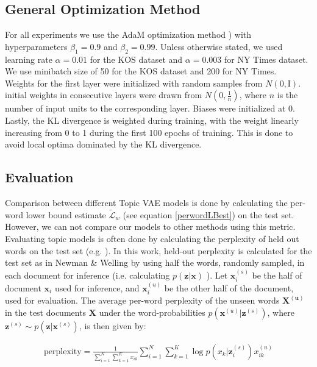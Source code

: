 \documentclass{report}
\begin{document}
	\subsection{General Optimization Method}\label{optim_section}
	For all experiments we use the AdaM optimization method \cite{kingma2014adam}) with hyperparameters $\beta_1 = 0.9$ and $\beta_2 = 0.99$. Unless otherwise stated, we used learning rate $\alpha = 0.01$ for the KOS dataset and $\alpha = 0.003$ for NY Times dataset.  We use minibatch size of 50 for the KOS dataset and 200 for NY Times.  \\
	Weights for the first layer were initialized with random samples from $N(0,\text{I})$. initial weights in consecutive layers were drawn from  $N(0,\frac{1}{n})$, where $n$ is the number of input units to the corresponding layer. Biases were initialized at 0.
	\\Lastly, the KL divergence is weighted during training, with the weight linearly increasing from 0 to 1 during the first 100 epochs of training. This is done to avoid local optima dominated by the KL divergence. 	
	
	\subsection{Evaluation}
	Comparison between different Topic VAE models is done by calculating the per-word lower bound estimate $\tilde{\mathcal{L}}_w$ (see equation \ref{perwordLBest}) on the test set. However, we can not compare our models to other methods using this metric. \\
	Evaluating topic models is often done by calculating the perplexity of held out words on the test set (e.g. \cite{blei2003latent, newman2007distributed, ranganath2015deep}). In this work, held-out perplexity is calculated for the test set as in Newman \& Welling \cite{newman2007distributed} by using half the words, randomly sampled, in each document for inference (i.e. calculating $p(\mathbf{z}|\mathbf{x})$ ). Let $\mathbf{x}_{i}^{(s)}$ be the half of document $\mathbf{x}_i$ used for inference, and $\mathbf{x}_{i}^{(u)}$ be the other half of the document, used for evaluation. The average per-word perplexity of the unseen words $\mathbf{X^{(u)}}$ in the test documents $\mathbf{X}$ under the word-probabilities $p(\mathbf{x}^{(u)}|\mathbf{z}^{(s)})$, where $\mathbf{z}^{(s)} \sim p(\mathbf{z}|\mathbf{x}^{(s)})$, is then given by:
	
	
	\begin{align}
	\text{perplexity} =  \frac{1}{\sum\limits_{i=1}^{N}\sum\limits_{k=1}^{K}x_{ik}}\sum\limits_{i=1}^N\sum\limits_{k=1}^{K} \log p(x_{k}|\mathbf{z}_{i}^{(s)})x_{ik}^{(u)}
	\end{align}\\
	
\end{document}
